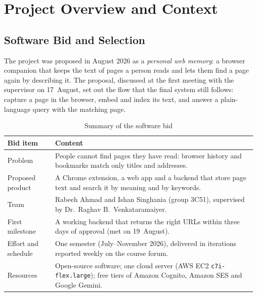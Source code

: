 
\chapter{Project Overview and Context}
\label{ch:overview}

\section{Software Bid and Selection}
\label{sec:bid}

The project was proposed in August 2026 as a \emph{personal web memory}: a
browser companion that keeps the text of pages a person reads and lets them
find a page again by describing it. The proposal, discussed at the first
meeting with the supervisor on 17~August, set out the flow that the final
system still follows: capture a page in the browser, embed and index its
text, and answer a plain-language query with the matching page.

\begin{table}[H]
\centering
\small
\begin{tabularx}{\textwidth}{>{\raggedright\arraybackslash}p{} L}
\toprule
\textbf{Bid item} & \textbf{Content} \\
\midrule
Problem & People cannot find pages they have read: browser history and bookmarks match only titles and addresses. \\
Proposed product & A Chrome extension, a web app and a backend that store page text and search it by meaning and by keywords. \\
Team & Rabeeh Ahmad and Ishan Singhania (group 3C51), supervised by Dr.\ Raghav B.\ Venkataramaiyer. \\
First milestone & A working backend that returns the right URLs within three days of approval (met on 19~August). \\
Effort and schedule & One semester (July--November 2026), delivered in iterations reported weekly on the course forum. \\
Resources & Open-source software; one cloud server (AWS EC2 \texttt{c7i-flex.large}); free tiers of Amazon Cognito, Amazon SES and Google Gemini. \\
\bottomrule
\end{tabularx}
\caption{Summary of the software bid}
\label{tab:bid}
\end{table}

